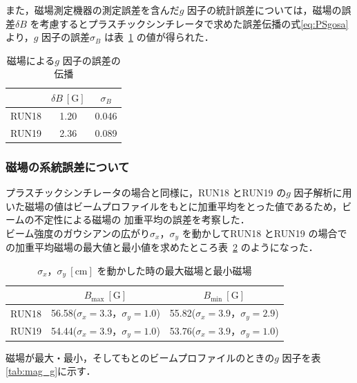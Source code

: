 また，磁場測定機器の測定誤差を含んだ$g$ 因子の統計誤差については，磁場の誤差$\delta B$ を考慮するとプラスチックシンチレータで求めた誤差伝播の式\eqref{eq:PSgosa}より，$g$ 因子の誤差$\sigma_{B}$ は表~\ref{tab:g_error} の値が得られた．

\begin{table}[H]%
\caption{磁場による$g$ 因子の誤差の伝播}
\centering
\begin{tabular}{ccc}\toprule
{} & $\delta B~[\mathrm{G}]$ &  $\sigma_{B}$  \\ \midrule
RUN18 & 1.20 & 0.046  \\
RUN19 & 2.36 & 0.089 \\ \bottomrule
\end{tabular}
\label{tab:g_error}
\end{table}


\subsubsection{磁場の系統誤差について}

プラスチックシンチレータの場合と同様に，RUN18 とRUN19 の$g$ 因子解析に用いた磁場の値はビームプロファイルをもとに加重平均をとった値であるため，ビームの不定性による磁場の
加重平均の誤差を考察した．\\
ビーム強度のガウシアンの広がり$\sigma_{x}，\sigma_{y}$ を動かしてRUN18 とRUN19 の場合での加重平均磁場の最大値と最小値を求めたところ表~\ref{tab:mag_max_min} のようになった．

\begin{table}[H]
\caption{$\sigma_{x}，\sigma_{y}~[\mathrm{cm}]$ を動かした時の最大磁場と最小磁場}
\centering
\begin{tabular}{ccc}\toprule%
{} & $B_\mathrm{max}~[\mathrm{G}]$ &  $B_\mathrm{min}~[\mathrm{G}]$   \\ \midrule
RUN18 & 56.58\;($\sigma_{x}=3.3，\sigma_{y}=1.0$) & 55.82\;($\sigma_{x}=3.9，\sigma_{y}=2.9$)  \\
RUN19 & 54.44\;($\sigma_{x}=3.9，\sigma_{y}=1.0$) & 53.76\;($\sigma_{x}=3.9，\sigma_{y}=1.0$) \\ \bottomrule
\end{tabular}
\label{tab:mag_max_min}
\end{table}

磁場が最大・最小，そしてもとのビームプロファイルのときの$g$ 因子を表\ref{tab:mag_g}に示す．

